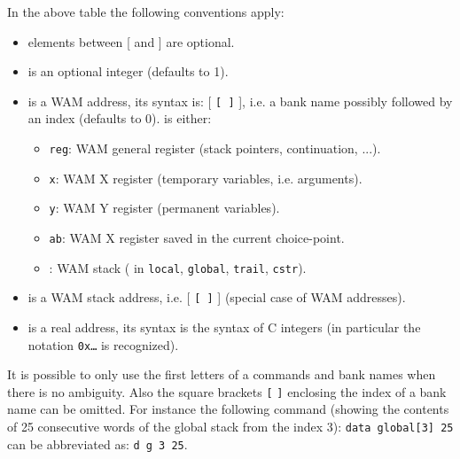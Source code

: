 In the above table the following conventions apply:

\begin{itemize}

\item elements between [ and ] are optional.

\item {} is an optional integer (defaults to 1).

\item {} is a WAM address, its syntax is:
 [ \texttt{[  ]} ], i.e. a bank name
possibly followed by an index (defaults to 0). 
is either:

\begin{itemize}

\item \texttt{reg}: WAM general register (stack pointers, continuation,
...). 

\item \texttt{x}: WAM X register (temporary variables, i.e. arguments).

\item \texttt{y}: WAM Y register (permanent variables).

\item \texttt{ab}: WAM X register saved in the current choice-point.

\item {}: WAM stack
( in \texttt{local}, \texttt{global}, \texttt{trail},
\texttt{cstr}).

\end{itemize}

\item {} is a WAM stack address, i.e.
\texttt{} [ \texttt{[  ]} ] (special case of
WAM addresses).

\item {} is a real address, its syntax is the syntax of C
integers (in particular the notation \texttt{0x\ldots} is recognized).

\end{itemize}

It is possible to only use the first letters of a commands and bank names
when there is no ambiguity. Also the square brackets \texttt{[} \texttt{]}
enclosing the index of a bank name can be omitted. For instance the
following command (showing the contents of 25 consecutive words of the
global stack from the index 3): \texttt{data global[3] 25} can be
abbreviated as: \texttt{d g 3 25}.

